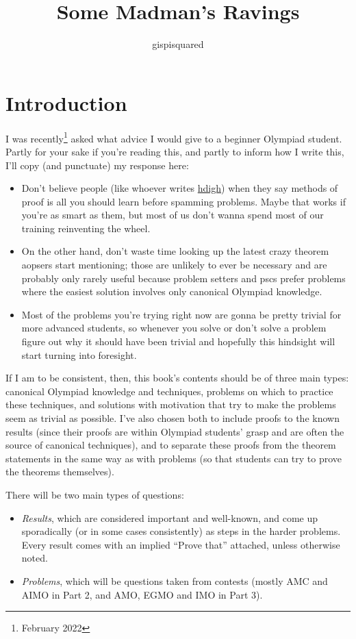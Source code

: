 \documentclass{amsart}
\title{Some Madman's Ravings}
\author{gispisquared}
\begin{document}
\maketitle
\tableofcontents
\newpage
\section*{Introduction}
I was recently\footnote{February 2022} asked what advice I would give to a
beginner Olympiad student. Partly for your sake if you're reading this, and
partly to inform how I write this, I'll copy (and punctuate) my response here:
\begin{itemize}
  \item Don't believe people (like whoever writes
    \href{https://how-did-i-get-here.com/olympiad/}{hdigh}) when they say methods
    of proof is all you should learn before spamming problems. Maybe that works
    if you're as smart as them, but most of us don't wanna spend most of our
    training reinventing the wheel.
  \item On the other hand, don't waste time looking up the latest crazy theorem
    aopsers start mentioning; those are unlikely to ever be necessary and are
    probably only rarely useful because problem setters and pscs prefer problems
    where the easiest solution involves only canonical Olympiad knowledge.
  \item Most of the problems you're trying right now are gonna be pretty
    trivial for more advanced students, so whenever you solve or
    don't solve a problem figure out why it should have been trivial and
    hopefully this hindsight will start turning into foresight.
\end{itemize}

If I am to be consistent, then, this book's contents should be of three main
types: canonical Olympiad knowledge and techniques, problems on which to
practice these techniques, and solutions with motivation that try to make the
problems seem as trivial as possible. I've also chosen both to include proofs to
the known results (since their proofs are within Olympiad students' grasp and
are often the source of canonical techniques), and to separate these proofs from
the theorem statements in the same way as with problems (so that
students can try to prove the theorems themselves). 

There will be two main types of questions:
\begin{itemize}
  \item \emph{Results}, which are considered important and well-known, and come
    up sporadically (or in some cases consistently) as steps in the harder
    problems. Every result comes with an implied ``Prove that'' attached, unless
    otherwise noted.
  \item \emph{Problems}, which will be questions taken from contests (mostly AMC
    and AIMO in Part 2, and AMO, EGMO and IMO in Part 3).
\end{itemize}
\end{document}
